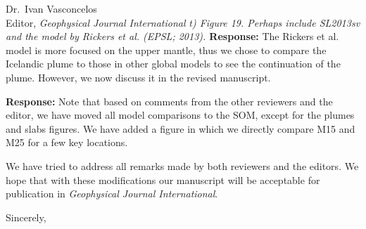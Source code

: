\documentclass[11pt,a4paper]{letter}
\newcommand{\response}[1]{\textbf{Response:} #1}
\newcommand{\rev}[1]{{\it{#1}}}
\begin{document}
\begin{letter}{Dr.~Ivan Vasconcelos\\
Editor, \textit{Geophysical Journal International}}
\rev{t) Figure 19. Perhaps include SL2013sv and the model by Rickers et al. (EPSL; 2013).
}
\response{The Rickers et al. model is more focused on the upper mantle, thus we chose to compare the Icelandic plume to those in other global models to see the continuation of the plume. However, we now discuss it in the revised manuscript.}

\response{Note that based on comments from the other reviewers and the editor, we have moved
all model comparisons to the SOM, except for the plumes and slabs figures.
We have added a figure in which we directly compare M15 and M25 for a few key locations.}

We have tried to address all remarks made by both reviewers and the editors.
We hope that with these modifications our manuscript will be acceptable for publication in \textit{Geophysical Journal International}.

\closing{Sincerely,}

\end{letter} 
\end{document}
